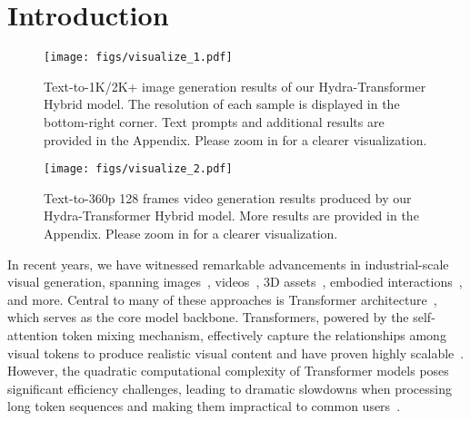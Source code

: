 \section{Introduction}
\label{sec:intro}

\begin{figure*}[t!]
  \centering
  \texttt{[image: figs/visualize\_1.pdf]}
  \vspace{-5pt}
  \caption{Text-to-1K/2K+ image generation results of our Hydra-Transformer Hybrid model. The resolution of each sample is displayed in the bottom-right corner. Text prompts and additional results are provided in the Appendix. Please zoom in for a clearer visualization.}
  \label{fig:visualize_1}
\end{figure*}

\begin{figure*}[t!]
  \centering
  \texttt{[image: figs/visualize\_2.pdf]}
  \vspace{-8pt}
  \caption{Text-to-360p 128 frames video generation results produced by our Hydra-Transformer Hybrid model. More results are provided in the Appendix. Please zoom in for a clearer visualization.}
  \label{fig:visualize_2}
  \vspace{-12pt}
\end{figure*}

In recent years, we have witnessed remarkable advancements in industrial-scale visual generation, spanning images~\citep{esser2021taming,dhariwal2021diffusion,rombach2022ldm,saharia2022imagen,peebles2023dit,chang2023muse,ruiz2023dreambooth,podell2023sdxl}, videos~\citep{yan2021videogpt,ho2022imagenvideo,blattmann2023align,girdhar2023emuvid,kondratyuk2023videopoet,bar2024lumiere}, 3D assets~\citep{hong2023lrm,li2023instant,xu2023dmv3d,wang2024dust3r,watson2024controlling}, embodied interactions~\citep{wu2023gr1,yang2023UniSim,du2024learning,cheang2024gr2,yang2024cogvideox}, and more. Central to many of these approaches is Transformer architecture~\citep{vaswani2017attention}, which serves as the core model backbone. Transformers, powered by the self-attention token mixing mechanism, effectively capture the relationships among visual tokens to produce realistic visual content and have proven highly scalable~\citep{dosovitskiy2020vit,dehghani2023scaling}. However, the quadratic computational complexity of Transformer models poses significant efficiency challenges, leading to dramatic slowdowns when processing long token sequences and making them impractical to common users~\citep{kitaev2020reformer,wang2020linformer,beltagy2020longformer}.

